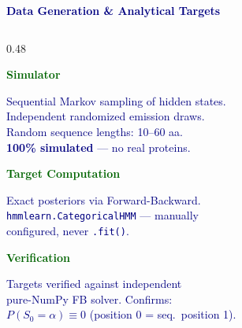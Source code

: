 \documentclass[aspectratio=169,10pt]{beamer}
\begin{document}
\begin{frame}[plain]


\vspace{0.28cm}
\hspace{0.30cm}
\begin{minipage}{0.90\textwidth}

{\large\textbf{\textcolor{navy}{Data Generation \& Analytical Targets}}}

\vspace{0.12cm}

\begin{columns}[T,totalwidth=\textwidth]

\begin{column}{0.48\textwidth}

{\fontsize{8.5}{10.0}\selectfont
\textbf{\textcolor{darkgreen}{Simulator}}
}

\vspace{0.06cm}

{\fontsize{7.0}{8.5}\selectfont
\textcolor{navy}{
Sequential Markov sampling of hidden states.\\[2pt]
Independent randomized emission draws.\\[2pt]
Random sequence lengths: 10–60 aa.\\[2pt]
\textbf{100\% simulated} — no real proteins.
}}

\vspace{0.18cm}

{\fontsize{8.5}{10.0}\selectfont
\textbf{\textcolor{darkgreen}{Target Computation}}
}

\vspace{0.06cm}

{\fontsize{7.0}{8.5}\selectfont
\textcolor{navy}{
Exact posteriors via Forward-Backward.\\[2pt]
\texttt{hmmlearn.CategoricalHMM} — manually\\[1pt]
configured, never \texttt{.fit()}.
}}

\vspace{0.18cm}

{\fontsize{8.5}{10.0}\selectfont
\textbf{\textcolor{darkgreen}{Verification}}
}

\vspace{0.06cm}

{\fontsize{7.0}{8.5}\selectfont
\textcolor{navy}{
Targets verified against independent\\[2pt]
pure-NumPy FB solver. Confirms:\\[2pt]
$P(S_0 = \alpha) \equiv 0$ (position 0 = seq.\ position 1).
}}


\end{column}
\end{columns}
\end{minipage}
\end{frame}
\end{document}
